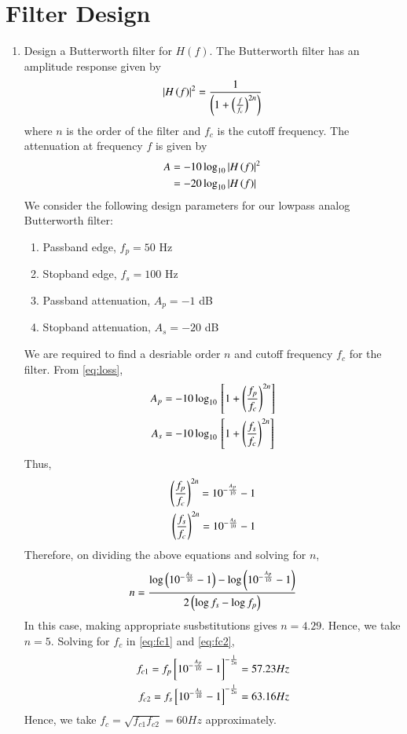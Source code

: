 \documentclass[journal,12pt,twocolumn]{IEEEtran}
\renewcommand\thesection{\arabic{section}}
\begin{document}
\section{Filter Design}
\begin{enumerate}[label=\thesection.\arabic*
,ref=\thesection.\theenumi]
\item Design a Butterworth filter for $H(f)$.
\solution The Butterworth filter has an amplitude response
given by
\begin{align}
    \left\vert H\left(f\right)\right\vert^2 = \frac{1}{\left(1 + \left(\frac{f}{f_c}\right)^{2n}\right)}
\end{align}
where $n$ is the order of the filter and $f_c$ is the cutoff
frequency. The attenuation at frequency $f$ is given by 
\begin{align}
    A &= -10\log_{10}\left\vert H\left(f\right)\right\vert^2 \\
      &= -20\log_{10}\left\vert H\left(f\right)\right\vert
    \label{eq:loss}
\end{align}
We consider the following design parameters for our
lowpass analog Butterworth filter:
\begin{enumerate}
    \item Passband edge, $f_p = 50$ Hz
    \item Stopband edge, $f_s = 100$ Hz
    \item Passband attenuation, $A_p = -1$ dB
    \item Stopband attenuation, $A_s = -20$ dB
\end{enumerate}
We are required to find a desriable order $n$ and cutoff
frequency $f_c$ for the filter. From \eqref{eq:loss},
\begin{align}
    A_p &= -10\log_{10}{}\left[1 + \left(\frac{f_p}{f_c}\right)^{2n}\right] \\
    A_s &= -10\log_{10}{}\left[1 + \left(\frac{f_s}{f_c}\right)^{2n}\right]
\end{align}
Thus,
\begin{align}
    \left(\frac{f_p}{f_c}\right)^{2n} = 10^{-\frac{A_p}{10}} - 1 \label{eq:fc1} \\
    \left(\frac{f_s}{f_c}\right)^{2n} = 10^{-\frac{A_s}{10}} - 1 \label{eq:fc2}
\end{align}
Therefore, on dividing the above equations and solving for $n$,
\begin{align}
    n = \frac{\log\left(10^{-\frac{A_s}{10}} - 1\right) - 
    \log\left(10^{-\frac{A_p}{10}} - 1\right)}{2\left(\log{f_s} - \log{f_p}\right)}
\end{align}
In this case, making appropriate susbstitutions gives $n = 4.29$.
Hence, we take $n = 5$. Solving for $f_c$ in \eqref{eq:fc1} and
\eqref{eq:fc2},
\begin{align}
    f_{c1} = f_p{}\left[10^{-\frac{A_p}{10}} - 1\right]^{-\frac{1}{2n}} = {57.23} Hz\\
    f_{c2} = f_s{}\left[10^{-\frac{A_s}{10}} - 1\right]^{-\frac{1}{2n}} = {63.16} Hz
\end{align}
Hence, we take $f_c = \sqrt{f_{c1}f_{c2}} = {60} Hz$ approximately.


\end{enumerate}
\end{document}
